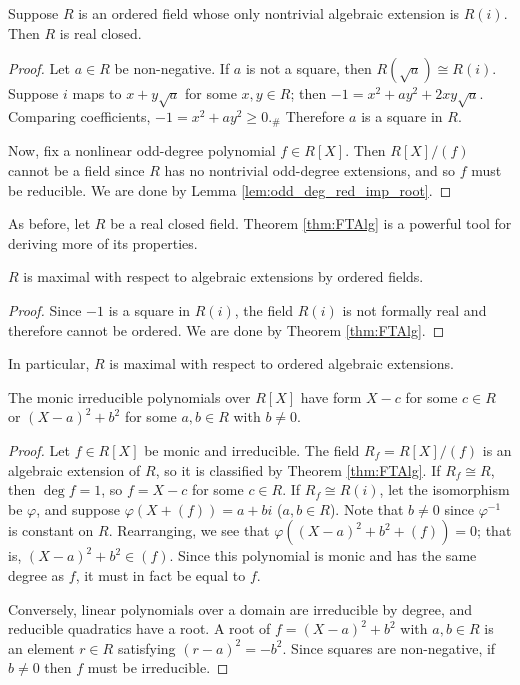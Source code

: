 \begin{lemma}
  \label{lem:FTAlg_converse}
  Suppose $R$ is an ordered field whose only nontrivial algebraic extension is $R(i)$. Then $R$ is real closed.
\end{lemma}
\begin{proof}
  Let $a\in R$ be non-negative. If $a$ is not a square, then $R(\sqrt{a})\cong R(i)$. Suppose $i$ maps to $x+y\sqrt{a}$ for some $x,y\in R$; then $-1=x^2+ay^2+2xy\sqrt{a}$. Comparing coefficients, $-1=x^2+ay^2\geq0$.$_\#$ Therefore $a$ is a square in $R$.

  Now, fix a nonlinear odd-degree polynomial $f\in R[X]$. Then $R[X]/(f)$ cannot be a field since $R$ has no nontrivial odd-degree extensions, and so $f$ must be reducible. We are done by Lemma \ref{lem:odd_deg_red_imp_root}.
\end{proof}

As before, let $R$ be a real closed field. Theorem \ref{thm:FTAlg} is a powerful tool for deriving more of its properties.

\begin{lemma}
  \label{lem:RCF_max}
  $R$ is maximal with respect to algebraic extensions by ordered fields.
\end{lemma}
\begin{proof}
  Since $-1$ is a square in $R(i)$, the field $R(i)$ is not formally real and therefore cannot be ordered. We are done by Theorem \ref{thm:FTAlg}.
\end{proof}

In particular, $R$ is maximal with respect to ordered algebraic extensions.

\begin{lemma}
  \label{lem:irreds_class}
  The monic irreducible polynomials over $R[X]$ have form $X-c$ for some $c\in R$ or $(X-a)^2+b^2$ for some $a,b\in R$ with $b\neq0$.
\end{lemma}
\begin{proof}
  Let $f\in R[X]$ be monic and irreducible. The field $R_f=R[X]/(f)$ is an algebraic extension of $R$, so it is classified by Theorem \ref{thm:FTAlg}. If $R_f\cong R$, then $\deg f=1$, so $f=X-c$ for some $c\in R$. If $R_f\cong R(i)$, let the isomorphism be $\varphi$, and suppose $\varphi(X+(f))=a+bi$ ($a,b\in R$). Note that $b\neq0$ since $\varphi^{-1}$ is constant on $R$. Rearranging, we see that $\varphi((X-a)^2+b^2+(f))=0$; that is, $(X-a)^2+b^2\in(f)$. Since this polynomial is monic and has the same degree as $f$, it must in fact be equal to $f$.

  Conversely, linear polynomials over a domain are irreducible by degree, and reducible quadratics have a root. A root of $f=(X-a)^2+b^2$ with $a,b\in R$ is an element $r\in R$ satisfying $(r-a)^2=-b^2$. Since squares are non-negative, if $b\neq0$ then $f$ must be irreducible.
\end{proof}

